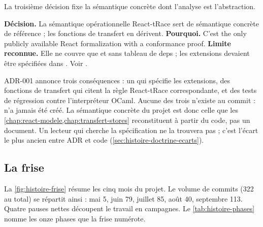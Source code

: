 La troisième décision fixe la sémantique concrète dont l'analyse est l'abstraction.

\begin{decision}
\textbf{Décision.} La sémantique opérationnelle React-tRace \cite{LeeAhnYi2025} sert de sémantique concrète de référence ; les fonctions de transfert en dérivent. \textbf{Pourquoi.} C'est \og the only publicly available React formalization with a conformance proof\fg{}. \textbf{Limite reconnue.} Elle ne couvre que  et  sans tableau de deps ; les extensions devaient être spécifiées dans . Voir .
\end{decision}

\begin{piege}
ADR-001 annonce trois conséquences : un  qui spécifie les extensions, des fonctions de transfert qui citent la règle React-tRace correspondante, et des tests de régression contre l'interpréteur OCaml. Aucune des trois n'existe au commit  :  n'a jamais été créé. La sémantique concrète du projet est donc celle que les \cref{chap:react-modele,chap:transfert-stores} reconstituent à partir du code, pas un document. Un lecteur qui cherche \og la spécification\fg{} ne la trouvera pas ; c'est l'écart le plus ancien entre ADR et code (\cref{sec:histoire-doctrine-ecarts}).
\end{piege}

\subsection{La frise}

La \cref{fig:histoire-frise} résume les cinq mois du projet. Le volume de commits (322 au total) se répartit ainsi : mai 5, juin 79, juillet 85, août 40, septembre 113. Quatre pauses nettes découpent le travail en campagnes. Le \cref{tab:histoire-phases} nomme les onze phases que la frise numérote.

